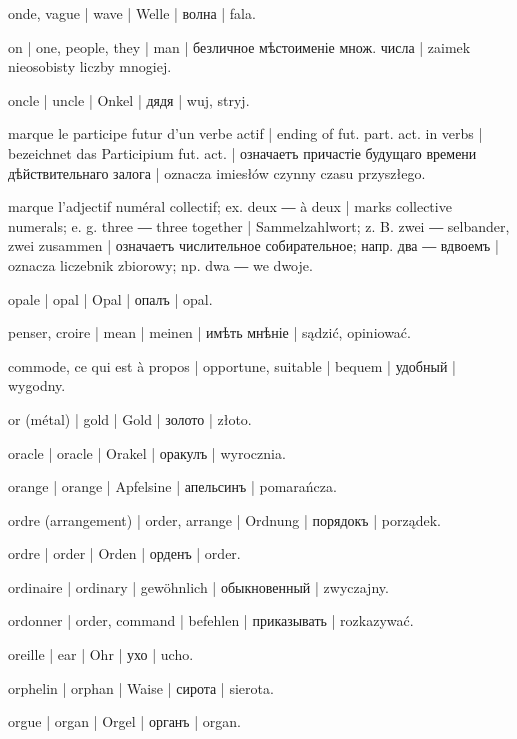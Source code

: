 \begin{outdent}{1em}
onde, vague | wave | Welle | волна | fala.

on | one, people, they | man | безличное мѣстоименіе множ. числа | zaimek nieosobisty liczby mnogiej.

oncle | uncle | Onkel | дядя | wuj, stryj.

marque le participe futur d’un verbe actif | ending of
fut. part. act. in verbs | bezeichnet das Participium fut. act. | означаетъ причастіе будущаго времени дѣйствительнаго залога | oznacza
imiesłów czynny czasu przyszłego.

marque l’adjectif numéral collectif; ex.  deux ―  à
deux | marks collective numerals; e. g.  three ― 
three together | Sammelzahlwort; z. B.  zwei ― 
selbander, zwei zusammen | означаетъ числительное собирательное;
напр.  два ―  вдвоемъ | oznacza liczebnik zbiorowy;
np.  dwa ―  we dwoje.

opale | opal | Opal | опалъ | opal.

penser, croire | mean | meinen | имѣть мнѣніе | sądzić, opiniować.

commode, ce qui est à propos | opportune, suitable | bequem | удобный | wygodny.

or (métal) | gold | Gold | золото | złoto.

oracle | oracle | Orakel | оракулъ | wyrocznia.

orange | orange | Apfelsine | апельсинъ | pomarańcza.

ordre (arrangement) | order, arrange | Ordnung | порядокъ | porządek.

ordre | order | Orden | орденъ | order.

ordinaire | ordinary | gewöhnlich | обыкновенный | zwyczajny.

ordonner | order, command | befehlen | приказывать | rozkazywać.

oreille | ear | Ohr | ухо | ucho.

orphelin | orphan | Waise | сирота | sierota.

orgue | organ | Orgel | органъ | organ.


\end{outdent}
